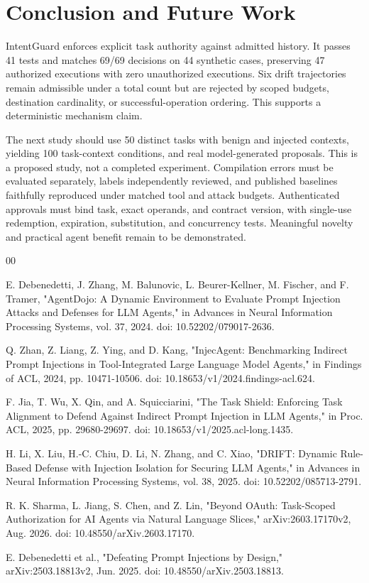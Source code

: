 \documentclass[conference,letterpaper]{IEEEtran}
\begin{document}
\section{Conclusion and Future Work}

IntentGuard enforces explicit task authority against admitted history. It passes 41 tests and matches 69/69 decisions on 44 synthetic cases, preserving 47 authorized executions with zero unauthorized executions. Six drift trajectories remain admissible under a total count but are rejected by scoped budgets, destination cardinality, or successful-operation ordering. This supports a deterministic mechanism claim.


The next study should use 50 distinct tasks with benign and injected contexts, yielding 100 task-context conditions, and real model-generated proposals. This is a proposed study, not a completed experiment. Compilation errors must be evaluated separately, labels independently reviewed, and published baselines faithfully reproduced under matched tool and attack budgets. Authenticated approvals must bind task, exact operands, and contract version, with single-use redemption, expiration, substitution, and concurrency tests. Meaningful novelty and practical agent benefit remain to be demonstrated.


\begin{thebibliography}{00}

 E. Debenedetti, J. Zhang, M. Balunovic, L. Beurer-Kellner, M. Fischer, and F. Tramer, "AgentDojo: A Dynamic Environment to Evaluate Prompt Injection Attacks and Defenses for LLM Agents," in Advances in Neural Information Processing Systems, vol. 37, 2024. doi: 10.52202/079017-2636.

 Q. Zhan, Z. Liang, Z. Ying, and D. Kang, "InjecAgent: Benchmarking Indirect Prompt Injections in Tool-Integrated Large Language Model Agents," in Findings of ACL, 2024, pp. 10471-10506. doi: 10.18653/v1/2024.findings-acl.624.

 F. Jia, T. Wu, X. Qin, and A. Squicciarini, "The Task Shield: Enforcing Task Alignment to Defend Against Indirect Prompt Injection in LLM Agents," in Proc. ACL, 2025, pp. 29680-29697. doi: 10.18653/v1/2025.acl-long.1435.

 H. Li, X. Liu, H.-C. Chiu, D. Li, N. Zhang, and C. Xiao, "DRIFT: Dynamic Rule-Based Defense with Injection Isolation for Securing LLM Agents," in Advances in Neural Information Processing Systems, vol. 38, 2025. doi: 10.52202/085713-2791.

 R. K. Sharma, L. Jiang, S. Chen, and Z. Lin, "Beyond OAuth: Task-Scoped Authorization for AI Agents via Natural Language Slices," arXiv:2603.17170v2, Aug. 2026. doi: 10.48550/arXiv.2603.17170.

 E. Debenedetti et al., "Defeating Prompt Injections by Design," arXiv:2503.18813v2, Jun. 2025. doi: 10.48550/arXiv.2503.18813.

\end{thebibliography}
\end{document}
